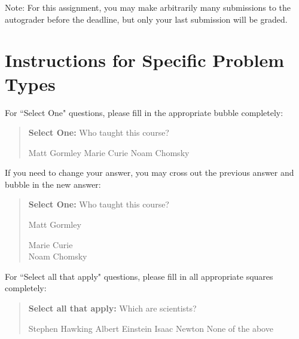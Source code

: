\documentclass[11pt,addpoints,answers]{exam}
\numberwithin{equation}{section} %
\numberwithin{figure}{section} %
\numberwithin{table}{section} %
\begin{document}
Note: For this assignment, you may make arbitrarily many submissions to the autograder before the deadline, but only your last submission will be graded.




\clearpage

\section*{Instructions for Specific Problem Types}

For ``Select One" questions, please fill in the appropriate bubble completely:

\begin{quote}
\textbf{Select One:} Who taught this course?
     \begin{checkboxes}
     \CorrectChoice Matt Gormley
     \choice Marie Curie
     \choice Noam Chomsky
    \end{checkboxes}
\end{quote}

If you need to change your answer, you may cross out the previous answer and bubble in the new answer:

\begin{quote}
\textbf{Select One:} Who taught this course?
\begin{list}{}
     \item\CIRCLE{} Matt Gormley
     \item\Circle{} Marie Curie\\
     \xcancel{\CIRCLE}{} Noam Chomsky
\end{list}
\end{quote}


For ``Select all that apply" questions, please fill in all appropriate squares completely:

\begin{quote}
\textbf{Select all that apply:} Which are scientists?
{
    \checkboxchar{$\Box$} \checkedchar{$\blacksquare$}
    \begin{checkboxes}
     \choice Stephen Hawking 
     \CorrectChoice Albert Einstein
     \choice Isaac Newton
     \choice None of the above
    \end{checkboxes}
    }
\end{quote}
\end{document}

